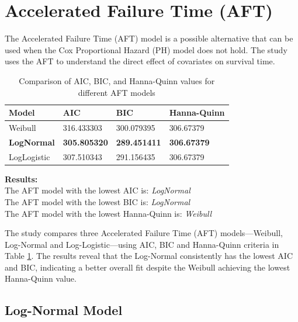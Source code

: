 \documentclass[doublespacing,12pt]{report}
\begin{document}
{\section{Accelerated Failure Time (AFT) }

\normalsize{The Accelerated Failure Time (AFT) model is a possible alternative that can be used when the Cox Proportional Hazard (PH) model does not hold. The study uses the AFT to understand the direct effect of covariates on survival time.}


\begin{table}[H]
    \centering
    \normalsize
    \begin{tabularx}{\textwidth}{lXXX}
        \toprule
        Model & AIC & BIC & Hanna-Quinn \\
        \midrule
        Weibull & 316.433303 & 300.079395 & 306.67379 \\
        \textbf{LogNormal} & \textbf{305.805320} & \textbf{289.451411} & \textbf{306.67379} \\
        LogLogistic & 307.510343 & 291.156435 & 306.67379 \\
        \bottomrule
    \end{tabularx}
    \caption{Comparison of AIC, BIC, and Hanna-Quinn values for different AFT models}
    \label{tab:model_comparison}
\end{table}



\noindent
\normalsize{\textbf{Results:} \\
The AFT model with the lowest AIC is: \textit{LogNormal} \\
The AFT model with the lowest BIC is: \textit{LogNormal} \\
The AFT model with the lowest Hanna-Quinn is: \textit{Weibull}

\noindent The study compares three Accelerated Failure Time (AFT) models—Weibull, Log-Normal and Log-Logistic—using AIC, BIC and Hanna-Quinn criteria in Table \ref{tab:model_comparison}. The results reveal that the Log-Normal  consistently has the lowest AIC and BIC, indicating a better overall fit despite the Weibull  achieving the lowest Hanna-Quinn value.}

\subsection{Log-Normal Model}


}
\end{document}
